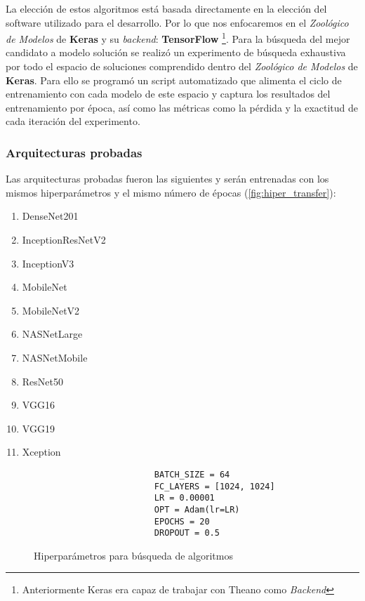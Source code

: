 La elección de estos algoritmos está basada directamente en la elección del
software utilizado para el desarrollo. Por lo que nos enfocaremos en el
\emph{Zoológico de Modelos} de \textbf{Keras} y su \emph{backend}:
\textbf{TensorFlow} \footnote{Anteriormente Keras era capaz de trabajar con
Theano como \emph{Backend}}. Para la búsqueda del mejor candidato a modelo solución se
realizó un experimento de búsqueda exhaustiva por todo el espacio de soluciones
comprendido dentro del \emph{Zoológico de Modelos} de \textbf{Keras}. Para ello
se programó un script automatizado que alimenta el ciclo de entrenamiento con
cada modelo de este espacio y captura los resultados del entrenamiento por
época, así como las métricas como la pérdida y la exactitud de cada iteración
del experimento.

\subsubsection{Arquitecturas probadas}

Las arquitecturas probadas fueron las siguientes y serán entrenadas con los
mismos hiperparámetros y el mismo número de épocas
(\autoref{fig:hiper_transfer}):

\begin{enumerate}
    \item DenseNet201
    \item InceptionResNetV2
    \item InceptionV3
    \item MobileNet
    \item MobileNetV2
    \item NASNetLarge
    \item NASNetMobile
    \item ResNet50
    \item VGG16
    \item VGG19
    \item Xception
\end{enumerate}

\begin{figure}[H]
    \centering
    \begin{verbatim}
                        BATCH_SIZE = 64
                        FC_LAYERS = [1024, 1024]
                        LR = 0.00001
                        OPT = Adam(lr=LR)
                        EPOCHS = 20
                        DROPOUT = 0.5
    \end{verbatim}
    \caption{Hiperparámetros para búsqueda de algoritmos}\label{fig:hiper_transfer}
\end{figure}

